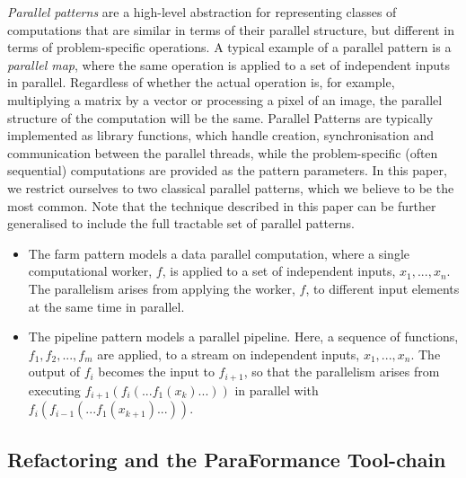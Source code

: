 \noindent
\emph{Parallel patterns} are a high-level abstraction for representing classes of computations that are similar in terms of their parallel structure, but different in terms of problem-specific operations. A typical example of a parallel pattern is a \emph{parallel map}, where the same operation is applied to a set of independent inputs in parallel. Regardless of whether the actual operation is, for example, multiplying a matrix by a vector or processing a pixel of an image, the parallel structure of the computation will be the same. Parallel Patterns are typically implemented as library functions, which handle creation, synchronisation and communication between the parallel threads, while the problem-specific (often sequential) computations are provided as the pattern parameters. In this paper, we restrict ourselves to two classical parallel patterns, which we believe to be the most common. Note that the technique described in this paper can be further generalised to include the full tractable set of parallel patterns.
\begin{itemize}
    \item The farm pattern models a data parallel computation, where a single computational worker, $f$, is applied to a set of independent inputs, $x_{1}, ..., x_{n}$. The parallelism arises from applying the worker, $f$, to different input elements at the same time in parallel. 
    \item The pipeline pattern models a parallel pipeline. Here, a sequence of functions, $f_{1}, f_{2}, ..., f_{m}$ are applied, to a stream on independent inputs, $x_{1}, ..., x_{n}$. The output of $f_{i}$ becomes the input to $f_{i+1}$, so that the parallelism arises from executing $f_{i+1}(f_{i}(...f_{1}(x_{k})...))$ in parallel with $f_{i}(f_{i-1}(...f_{1}(x_{k+1})...))$.
\end{itemize}


\subsection{Refactoring and the ParaFormance Tool-chain}


